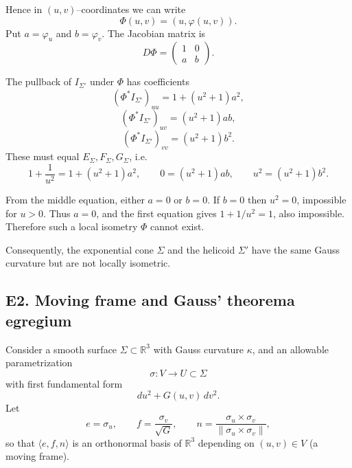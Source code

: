 \documentclass[12pt,a4paper]{article}
\theoremstyle{plain}
\theoremstyle{definition}      %
\begin{document}
	Hence in $(u,v)$–coordinates we can write
	\[
	\Phi(u,v) = (u,\varphi(u,v)).
	\]
	Put $a=\varphi_u$ and $b=\varphi_v$. The Jacobian matrix is
	\[
	D\Phi =
	\begin{pmatrix}
		1 & 0\\[2pt]
		a & b
	\end{pmatrix}.
	\]
	
	The pullback of $I_{\Sigma'}$ under $\Phi$ has coefficients
	\[
	(\Phi^* I_{\Sigma'})_{uu} = 1 + (u^2+1)a^2,
	\]
	\[
	(\Phi^* I_{\Sigma'})_{uv} = (u^2+1)ab,
	\]
	\[
	(\Phi^* I_{\Sigma'})_{vv} = (u^2+1)b^2.
	\]
	These must equal $E_\Sigma, F_\Sigma, G_\Sigma$, i.e.
	\[
	1+\frac{1}{u^2} = 1 + (u^2+1)a^2,\qquad
	0 = (u^2+1)ab,\qquad
	u^2 = (u^2+1)b^2.
	\]
	
	From the middle equation, either $a=0$ or $b=0$.
	If $b=0$ then $u^2=0$, impossible for $u>0$.
	Thus $a=0$, and the first equation gives $1+1/u^2=1$, also impossible.
	Therefore such a local isometry $\Phi$ cannot exist.
	
	Consequently, the exponential cone $\Sigma$ and the helicoid $\Sigma'$ have the
	same Gauss curvature but are not locally isometric.
	
	\subsection*{E2. Moving frame and Gauss' theorema egregium}
	
	Consider a smooth surface $\Sigma\subset\mathbb{R}^3$ with Gauss curvature
	$\kappa$, and an allowable parametrization
	\[
	\sigma:V\to U\subset\Sigma
	\]
	with first fundamental form
	\[
	du^2 + G(u,v)\,dv^2.
	\]
	Let
	\[
	e=\sigma_u,\qquad
	f = \frac{\sigma_v}{\sqrt{G}},\qquad
	n = \frac{\sigma_u\times\sigma_v}{\|\sigma_u\times\sigma_v\|},
	\]
	so that $\langle e,f,n\rangle$ is an orthonormal basis of $\mathbb{R}^3$
	depending on $(u,v)\in V$ (a moving frame).
	
\end{document}
